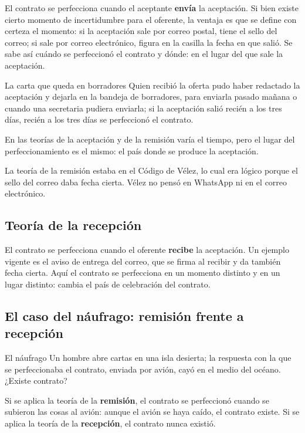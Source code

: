 \documentclass[12pt,oneside]{book}
\begin{document}
El contrato se perfecciona cuando el aceptante \textbf{envía} la aceptación. Si bien existe cierto momento de incertidumbre para el oferente, la ventaja es que se define con certeza el momento: si la aceptación sale por correo postal, tiene el sello del correo; si sale por correo electrónico, figura en la casilla la fecha en que salió. Se sabe así cuándo se perfeccionó el contrato y dónde: en el lugar del que sale la aceptación.

\begin{example}{La carta que queda en borradores}
Quien recibió la oferta pudo haber redactado la aceptación y dejarla en la bandeja de borradores, para enviarla pasado mañana o cuando una secretaria pudiera enviarla; si la aceptación salió recién a los tres días, recién a los tres días se perfeccionó el contrato.
\end{example}

En las teorías de la aceptación y de la remisión varía el tiempo, pero el lugar del perfeccionamiento es el mismo: el país donde se produce la aceptación.

La teoría de la remisión estaba en el Código de Vélez, lo cual era lógico porque el sello del correo daba fecha cierta. Vélez no pensó en WhatsApp ni en el correo electrónico.

\subsection{Teoría de la recepción}

El contrato se perfecciona cuando el oferente \textbf{recibe} la aceptación. Un ejemplo vigente es el aviso de entrega del correo, que se firma al recibir y da también fecha cierta. Aquí el contrato se perfecciona en un momento distinto y en un lugar distinto: cambia el país de celebración del contrato.

\subsection{El caso del náufrago: remisión frente a recepción}

\begin{example}{El náufrago}
Un hombre abre cartas en una isla desierta; la respuesta con la que se perfeccionaba el contrato, enviada por avión, cayó en el medio del océano. ¿Existe contrato?

Si se aplica la teoría de la \textbf{remisión}, el contrato se perfeccionó cuando se subieron las cosas al avión: aunque el avión se haya caído, el contrato existe. Si se aplica la teoría de la \textbf{recepción}, el contrato nunca existió.
\end{example}
\end{document}

